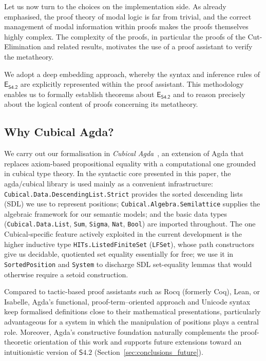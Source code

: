 \documentclass{article}
\newcommand{\logic}{\mathsf{S4.2}}
\newcommand{\eseq}{\mathsf{E}_{{\textsf{S4.2}}}}
\newcommand{\agda}{\textsf{Agda}}
\theoremstyle{definition}
\begin{document}
Let us now turn to the choices on the implementation side. As already emphasised, the proof theory of modal logic is far from trivial, and the correct management of modal information within proofs makes the proofs themselves highly complex.
The complexity of the proofs, in particular the proofs of the Cut-Elimination and related results, motivates the use of a proof assistant to verify the metatheory.


We adopt a deep embedding approach, whereby the syntax and inference rules of $\eseq$ are explicitly represented within the proof assistant. This methodology enables us to formally establish theorems about $\eseq$ and to reason precisely about the logical content of proofs concerning its metatheory.





\subsection{Why Cubical \agda?}
We carry out our formalisation in \emph{Cubical \agda}~\cite{VMA2021:CubicalAgda,AgdaTeam2025:Documentation}, an extension of \agda{} that replaces axiom-based propositional equality with a computational one grounded in cubical type theory.
In the syntactic core presented in this paper, the \textsf{agda/cubical} library is used mainly as a convenient infrastructure: \texttt{Cubical.Data.DescendingList.Strict} provides the sorted descending lists (SDL) we use to represent positions; \texttt{Cubical.Algebra.Semilattice} supplies the algebraic framework for our semantic models; and the basic data types (\texttt{Cubical.Data.List}, \texttt{Sum}, \texttt{Sigma}, \texttt{Nat}, \texttt{Bool}) are imported throughout.
The one Cubical-specific feature actively exploited in the current development is the higher inductive type \texttt{HITs.ListedFiniteSet} (\texttt{LFSet}), whose path constructors give us decidable, quotiented set equality essentially for free; we use it in \texttt{SortedPosition} and \texttt{System} to discharge SDL set-equality lemmas that would otherwise require a setoid construction.

Compared to tactic-based proof assistants such as Rocq (formerly Coq), Lean, or Isabelle, \agda{}'s functional, proof-term--oriented approach and Unicode syntax keep formalised definitions close to their mathematical presentations, particularly advantageous for a system in which the manipulation of positions plays a central role.
Moreover, \agda{}'s constructive foundation naturally complements the proof-theoretic orientation of this work and supports future extensions toward an intuitionistic version of $\logic$ (Section~\ref{sec:conclusions_future}).
\end{document}
